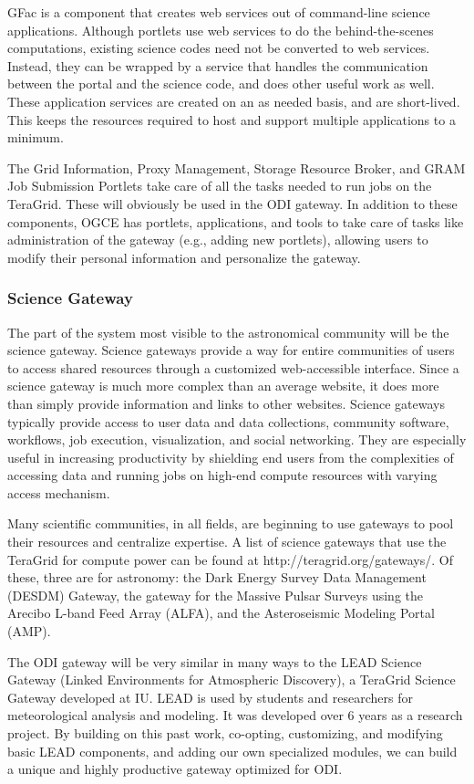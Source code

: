 \documentclass[10pt,conference]{IEEEtran}
\begin{document}
GFac is a component that creates web services out of command-line science applications. Although portlets use web services to do the behind-the-scenes computations, existing science codes need not be converted to web services. Instead, they can be wrapped by a service that handles the communication between the portal and the science code, and does other useful work as well. These application services are created on an as needed basis, and are short-lived. This keeps the resources required to host and support multiple applications to a minimum.

The Grid Information, Proxy Management, Storage Resource Broker, and GRAM Job Submission Portlets take care of all the tasks needed to run jobs on the TeraGrid. These will obviously be used in the ODI gateway. In addition to these components, OGCE has portlets, applications, and tools to take care of tasks like administration of the gateway (e.g., adding new portlets), allowing users to modify their personal information and personalize the gateway. 

\subsubsection{Science Gateway}

The part of the system most visible to the astronomical community will be the science gateway. Science gateways provide a way for entire communities of users to access shared resources through a customized web-accessible interface. Since a science gateway is much more complex than an average website, it does more than simply provide information and links to other websites. Science gateways typically provide access to user data and data collections, community software, workflows, job execution, visualization, and social networking. They are especially useful in increasing productivity by shielding end users from the complexities of accessing data and running jobs on high-end compute resources with varying access mechanism.

Many scientific communities, in all fields, are beginning to use gateways to pool their resources and centralize expertise.  A list of science gateways that use the TeraGrid for compute power can be found at http://teragrid.org/gateways/. Of these, three are for astronomy: the Dark Energy Survey Data Management (DESDM) Gateway, the gateway for the Massive Pulsar Surveys using the Arecibo L-band Feed Array (ALFA), and the Asteroseismic Modeling Portal (AMP).  

The ODI gateway will be very similar in many ways to the LEAD Science Gateway (Linked Environments for Atmospheric Discovery), a TeraGrid Science Gateway developed at IU. LEAD is used by students and researchers for meteorological analysis and modeling. It was developed over 6 years as a research project. By building on this past work, co-opting, customizing, and modifying basic LEAD components, and adding our own specialized modules, we can build a unique and highly productive gateway optimized for ODI.
\end{document}
